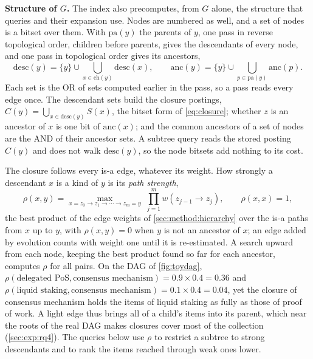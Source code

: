 \textbf{Structure of $G$.} The index also precomputes, from $G$ alone, the
structure that queries and their expansion use. Nodes are numbered as well,
and a set of nodes is a bitset over them. With $\mathrm{pa}(y)$ the parents
of $y$, one pass in reverse topological order, children before parents,
gives the descendants of every node, and one pass in topological order gives
its ancestors,
\begin{equation}
  \label{eq:descanc}
  \mathrm{desc}(y) = \{y\} \cup \bigcup_{x \in \mathrm{ch}(y)} \mathrm{desc}(x),
  \qquad
  \mathrm{anc}(y) = \{y\} \cup \bigcup_{p \in \mathrm{pa}(y)} \mathrm{anc}(p).
\end{equation}
Each set is the OR of sets computed earlier in the pass, so a pass reads
every edge once. The descendant sets build the closure postings,
$C(y) = \bigcup_{x \in \mathrm{desc}(y)} S(x)$, the bitset form of
\cref{eq:closure}; whether $z$ is an ancestor of $x$ is one bit of
$\mathrm{anc}(x)$; and the common ancestors of a set of nodes are the AND of
their ancestor sets. A subtree query reads the stored posting $C(y)$ and
does not walk $\mathrm{desc}(y)$, so the node bitsets add nothing to its
cost.

The closure follows every is-a edge, whatever its weight. How strongly a
descendant $x$ is a kind of $y$ is its \emph{path strength},
\begin{equation}
  \label{eq:rho}
  \rho(x, y) = \max_{x = z_0 \to z_1 \to \cdots \to z_m = y} \;
  \prod_{j=1}^{m} w(z_{j-1} \to z_j), \qquad \rho(x, x) = 1,
\end{equation}
the best product of the edge weights of \cref{sec:method:hierarchy} over the
is-a paths from $x$ up to $y$, with $\rho(x, y) = 0$ when $y$ is not an
ancestor of $x$; an edge added by evolution counts with weight one until it
is re-estimated. A search upward from each node, keeping the best product
found so far for each ancestor, computes $\rho$ for all pairs. On the DAG of
\cref{fig:toydag}, $\rho(\text{delegated PoS}, \text{consensus mechanism}) =
0.9 \times 0.4 = 0.36$ and $\rho(\text{liquid staking}, \text{consensus
mechanism}) = 0.1 \times 0.4 = 0.04$, yet the closure of consensus mechanism
holds the items of liquid staking as fully as those of proof of work. A light
edge thus brings all of a child's items into its parent, which near the
roots of the real DAG makes closures cover most of the collection
(\cref{sec:exp:rq4}). The queries below use $\rho$ to restrict a subtree to
strong descendants and to rank the items reached through weak ones lower.


